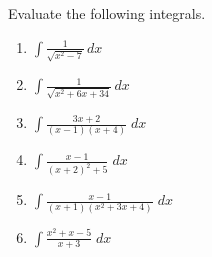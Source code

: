 \documentclass{exam}[12pt]
\begin{document}
\pagestyle{head}

\extraheadheight{.3in}
\extrafootheight{-.3in} 


\vspace{.2in}
\large{
Evaluate the following integrals.
\begin{enumerate}
\item $\displaystyle \int \frac{1}{\sqrt{x^2 - 7}}   \, dx$
\vspace{.3in}

\item $\displaystyle \int \frac{1}{\sqrt{x^2 +6x + 34}}   \, dx$
\vspace{.3in}


\item $\displaystyle \int  \frac{3x+2}{(x-1)(x+4)}  \; dx  $
\vspace{.3in}

\item $\displaystyle \int \frac{x-1}{(x+2)^2+5}\; dx$
\vspace{.3in}

\item $\displaystyle \int \frac{x-1}{(x+1)(x^2+3x+4)}\; dx $
\vspace{.3in}

\item $\displaystyle \int  \frac{x^2 + x -5}{x + 3}     \; dx  $
\vspace{.3in}
\end{enumerate}
}
\end{document}
